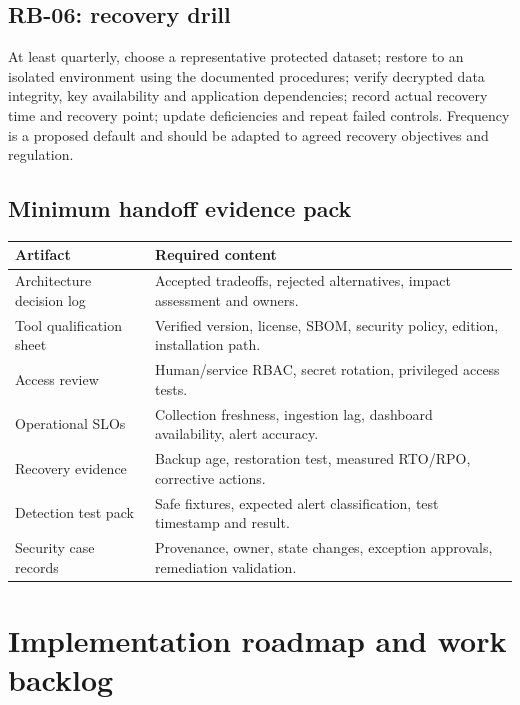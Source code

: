 \documentclass[11pt,oneside]{report}
\begin{document}
\section{RB-06: recovery drill}
At least quarterly, choose a representative protected dataset; restore to an isolated environment using the documented procedures; verify decrypted data integrity, key availability and application dependencies; record actual recovery time and recovery point; update deficiencies and repeat failed controls. Frequency is a proposed default and should be adapted to agreed recovery objectives and regulation.

\section{Minimum handoff evidence pack}

\noindent\begin{tabularx}{\textwidth}{P{0.24\textwidth}Y}
\toprule Artifact & Required content\\\midrule
Architecture decision log & Accepted tradeoffs, rejected alternatives, impact assessment and owners.\\
Tool qualification sheet & Verified version, license, SBOM, security policy, edition, installation path.\\
Access review & Human/service RBAC, secret rotation, privileged access tests.\\
Operational SLOs & Collection freshness, ingestion lag, dashboard availability, alert accuracy.\\
Recovery evidence & Backup age, restoration test, measured RTO/RPO, corrective actions.\\
Detection test pack & Safe fixtures, expected alert classification, test timestamp and result.\\
Security case records & Provenance, owner, state changes, exception approvals, remediation validation.\\
\bottomrule
\end{tabularx}

\chapter{Implementation roadmap and work backlog}
\end{document}
